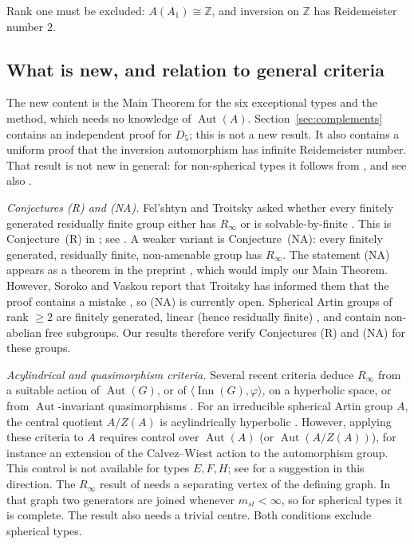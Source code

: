 \documentclass[11pt]{amsart}
\theoremstyle{definition}
\newcommand{\Z}{\mathbb{Z}}
\newcommand{\Aut}{\operatorname{Aut}}
\newcommand{\Inn}{\operatorname{Inn}}
\newcommand{\Rinf}{R_\infty}
\begin{document}
Rank one must be excluded: $A(A_1)\cong\Z$, and inversion on $\Z$ has Reidemeister number $2$.

\subsection{What is new, and relation to general criteria}
The new content is the Main Theorem for the six exceptional types and the method, which needs no knowledge of $\Aut(A)$.
Section~\ref{sec:complements} contains an independent proof for $D_5$; this is not a new result. It also
contains a uniform proof that the inversion automorphism has infinite Reidemeister number. That result is not
new in general: for non-spherical types it follows from \cite[Thm.~1]{Sor26}, and see also \cite{Juh11}.

\smallskip\noindent\emph{Conjectures (R) and (NA).} Fel'shtyn and Troitsky asked whether every finitely generated
residually finite group either has $\Rinf$ or is solvable-by-finite \cite{FT15}. This is Conjecture~(R) in
\cite[\S6]{SV24}; see \cite[Problem~19.28]{Kourovka}. A weaker variant is Conjecture~(NA): every finitely
generated, residually finite, non-amenable group has $\Rinf$. The statement (NA) appears as a theorem in the
preprint \cite{FT12}, which would imply our Main Theorem. However, Soroko and Vaskou report that Troitsky has
informed them that the proof contains a mistake \cite[\S6]{SV24}, so (NA) is currently open. Spherical Artin
groups of rank $\ge2$ are finitely generated, linear (hence residually finite) \cite{CW02,Dig03}, and contain
non-abelian free subgroups. Our results therefore verify Conjectures (R) and (NA) for these groups.

\smallskip\noindent\emph{Acylindrical and quasimorphism criteria.} Several recent criteria deduce $\Rinf$ from a
suitable action of $\Aut(G)$, or of $\langle\Inn(G),\varphi\rangle$, on a hyperbolic space, or from
$\Aut$-invariant quasimorphisms \cite{FFW23,FFIMSW25,SV26}. For an irreducible spherical Artin group $A$, the central quotient $A/Z(A)$
is acylindrically hyperbolic \cite{CW17}. However, applying these criteria to $A$ requires control over
$\Aut(A)$ (or $\Aut(A/Z(A))$), for instance an extension of the Calvez--Wiest action to the automorphism group.
This control is not available for types $E,F,H$; see \cite[Remark~4.8 and footnote~3]{JMS25} for a suggestion in
this direction. The $\Rinf$ result of \cite[Cor.~H]{JMS25} needs a separating vertex of the defining graph. In that graph two
generators are joined whenever $m_{st}<\infty$, so for spherical types it is complete. The result also needs a
trivial centre. Both conditions exclude spherical types.
\end{document}
